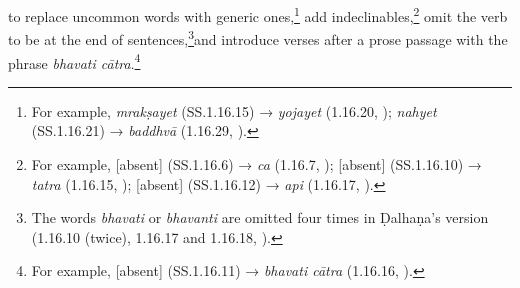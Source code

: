 to replace uncommon words with generic ones,\footnote{For example, \emph{mrakṣayet} 
(SS.1.16.15) → \emph{yojayet} (1.16.20, \cite[79]{vulgate}); \emph{nahyet} (SS.1.16.21) → 
\emph{baddhvā} (1.16.29, \cite[81]{vulgate}).} add indeclinables,\footnote{For example, 
[absent]  (SS.1.16.6) → \emph{ca} (1.16.7, \cite[77]{vulgate}); [absent] (SS.1.16.10) → 
\emph{tatra} (1.16.15, \cite[78]{vulgate}); [absent]  (SS.1.16.12) → \emph{api} (1.16.17, 
\cite[79]{vulgate}).} omit the verb to be at the end of sentences,\footnote{The words 
\emph{bhavati} or \emph{bhavanti} are omitted four times in Ḍalhaṇa's version (1.16.10 
(twice), 1.16.17 and 1.16.18, \cite[77, 79]{vulgate}).}and introduce verses after a prose 
passage with the phrase \emph{bhavati cātra}.\footnote{For example, [absent] (SS.1.16.11) 
→ \emph{bhavati cātra} (1.16.16, \cite[79]{vulgate}).} 








